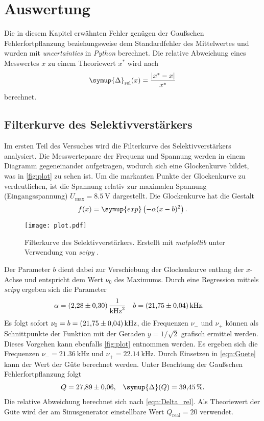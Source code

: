 \section{Auswertung}
\label{sec:Auswertung}
Die in diesem Kapitel erwähnten Fehler genügen der Gaußschen Fehlerfortpflanzung beziehungsweise dem Standardfehler des Mittelwertes und wurden mit \textit{uncertainties}
\cite{uncertainties} in \textit{Python} berechnet. Die relative Abweichung eines Messwertes $x$ zu einem Theoriewert $x^*$ wird nach 
\begin{equation}
  \label{eqn:Delta_rel}
  \symup{\Delta}_\text{rel}(x) = \frac{|x^* - x|}{x^*}
\end{equation}
berechnet.

\subsection{Filterkurve des Selektivverstärkers}
\label{subsec:A_Filterkurve}
Im ersten Teil des Versuches wird die Filterkurve des Selektivverstärkers analysiert. Die Messwertepaare der Frequenz und Spannung werden in einem Diagramm gegeneinander
aufgetragen, wodurch sich eine Glockenkurve bildet, was in \autoref{fig:plot} zu sehen ist. Um die markanten Punkte der Glockenkurve zu verdeutlichen, ist die Spannung 
relativ zur maximalen Spannung (Eingangsspannung) $U_\text{max} = \qty{8.5}{\volt}$ dargestellt. 
Die Glockenkurve hat die Gestalt
\begin{equation*}
  \label{eqn:Gaussglocke}
  f(x) = \symup{exp}\left(-\alpha(x-b)^2\right).
\end{equation*}

\begin{figure}[H]
  \centering
  \texttt{[image: plot.pdf]}
  \caption{Filterkurve des Selektivverstärkers. Erstellt mit \textit{matplotlib} \cite{matplotlib} unter Verwendung von \textit{scipy} \cite{scipy}.}
  \label{fig:plot}
\end{figure}

Der Parameter $b$ dient dabei zur Verschiebung der Glockenkurve entlang der $x$-Achse und entspricht dem Wert $\nu_0$ des Maximums. 
Durch eine Regression mittels \textit{scipy} \cite{scipy} ergeben sich die Parameter
\begin{align}
  \label{eqn:Parameter}
  \alpha &= \qty{2.28 +- 0.3}{\per\kilo\hertz\squared} & b &= \qty{21.75 +- 0.04}{\kilo\hertz}.
\end{align}
Es folgt sofort $\nu_0 = b = \qty{21.75 +- 0.04}{\kilo\hertz}$, die Frequenzen $\nu_-$ und $\nu_+$ können als Schnittpunkte der Funktion mit der Geraden $y = 1/\sqrt{2}$
grafisch ermittel werden. Dieses Vorgehen kann ebenfalls \autoref{fig:plot} entnommen werden. 
Es ergeben sich die Frequenzen $\nu_- = \qty{21.36}{\kilo\hertz}$ und $\nu_+ = \qty{22.14}{\kilo\hertz}$. 
Durch Einsetzen in \autoref{eqn:Guete} kann der Wert der Güte berechnet werden.
Unter Beachtung der Gaußschen Fehlerfortpflanzung folgt
\begin{align*}
  Q &= \num{27.89 +- 0.06}, & \symup{\Delta}(Q) = \qty{39.45}{\percent}.
\end{align*}
Die relative Abweichung berechnet sich nach \autoref{eqn:Delta_rel}. Als Theoriewert der Güte wird der am Sinusgenerator einstellbare Wert $Q_\text{real} = 20$ verwendet.

